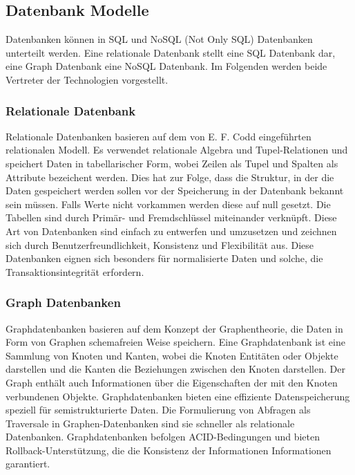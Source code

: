 
\subsection{Datenbank Modelle} %
Datenbanken können in SQL und NoSQL (Not Only SQL) Datenbanken unterteilt werden. Eine relationale Datenbank stellt eine SQL Datenbank dar, eine Graph Datenbank eine NoSQL Datenbank. Im Folgenden werden beide Vertreter der Technologien vorgestellt.
\subsubsection{Relationale Datenbank} %
\label{sec:relationaleDatenbanken}
Relationale Datenbanken basieren auf dem von E. F. Codd eingeführten relationalen Modell. Es verwendet relationale Algebra und Tupel-Relationen und speichert Daten in tabellarischer Form, wobei Zeilen als Tupel und Spalten als Attribute bezeichent werden. Dies hat zur Folge, dass die Struktur, in der die Daten gespeichert werden sollen vor der Speicherung in der Datenbank bekannt sein müssen. Falls Werte nicht vorkammen werden diese auf null gesetzt. Die Tabellen sind durch Primär- und Fremdschlüssel miteinander verknüpft. Diese Art von Datenbanken sind einfach zu entwerfen und umzusetzen und zeichnen sich durch Benutzerfreundlichkeit, Konsistenz und Flexibilität aus. Diese Datenbanken eignen sich besonders für normalisierte Daten und solche, die Transaktionsintegrität erfordern.
 \citep{relationalDatabase}  \citep{9677042}
\subsubsection{Graph Datenbanken} %
\label{sec:graphDatenbanken}
Graphdatenbanken basieren auf dem Konzept der Graphentheorie, die Daten in Form von Graphen schemafreien Weise speichern. Eine Graphdatenbank ist eine Sammlung von Knoten und Kanten, wobei die Knoten Entitäten oder Objekte darstellen und die Kanten die Beziehungen zwischen den Knoten darstellen. Der Graph  enthält auch Informationen über die Eigenschaften der mit den Knoten verbundenen Objekte. Graphdatenbanken bieten eine effiziente Datenspeicherung speziell für semistrukturierte Daten. Die Formulierung von Abfragen als Traversale in Graphen-Datenbanken sind sie schneller als relationale Datenbanken. Graphdatenbanken befolgen ACID-Bedingungen und bieten Rollback-Unterstützung, die die Konsistenz der Informationen Informationen garantiert.
\citep{9677042}


\label{sec:datenbanktypen}




